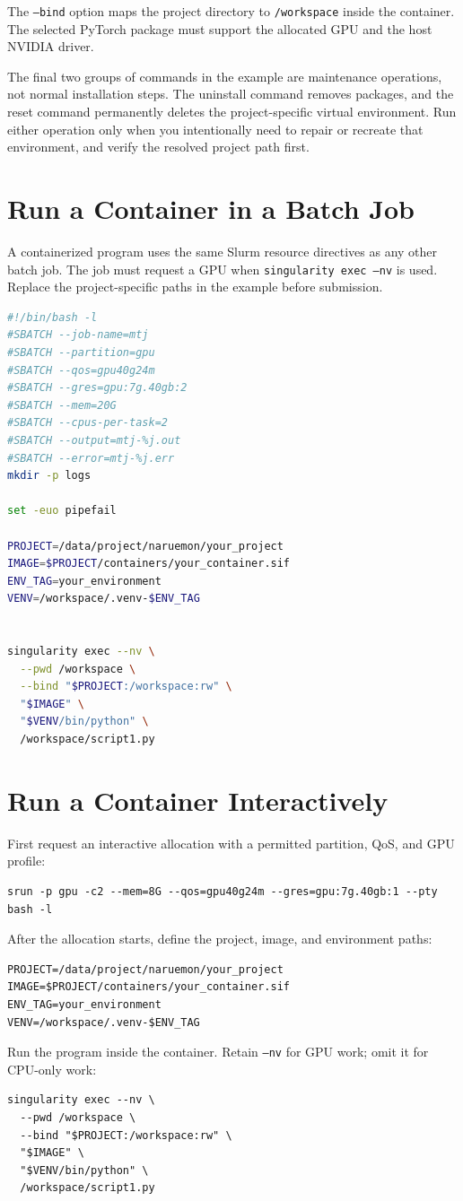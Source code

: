 \documentclass[11pt,oneside]{memoir}
\begin{document}
The \texttt{--bind} option maps the project directory to \texttt{/workspace} inside the container. The selected PyTorch package must support the allocated GPU and the host NVIDIA driver.

The final two groups of commands in the example are maintenance operations, not normal installation steps. The uninstall command removes packages, and the reset command permanently deletes the project-specific virtual environment. Run either operation only when you intentionally need to repair or recreate that environment, and verify the resolved project path first.

\section{Run a Container in a Batch Job}
\label{subsec:container-sbatch}

A containerized program uses the same Slurm resource directives as any other batch job. The job must request a GPU when \texttt{singularity exec --nv} is used. Replace the project-specific paths in the example before submission.
\begin{lstlisting}[language=bash]
#!/bin/bash -l
#SBATCH --job-name=mtj
#SBATCH --partition=gpu
#SBATCH --qos=gpu40g24m
#SBATCH --gres=gpu:7g.40gb:2
#SBATCH --mem=20G
#SBATCH --cpus-per-task=2
#SBATCH --output=mtj-%j.out
#SBATCH --error=mtj-%j.err
mkdir -p logs

set -euo pipefail

PROJECT=/data/project/naruemon/your_project
IMAGE=$PROJECT/containers/your_container.sif
ENV_TAG=your_environment
VENV=/workspace/.venv-$ENV_TAG


singularity exec --nv \
  --pwd /workspace \
  --bind "$PROJECT:/workspace:rw" \
  "$IMAGE" \
  "$VENV/bin/python" \
  /workspace/script1.py


\end{lstlisting}


\section{Run a Container Interactively}
\label{subsec:container-srun}

First request an interactive allocation with a permitted partition, QoS, and GPU profile:
\begin{lstlisting}[style = terminal]
  srun -p gpu -c2 --mem=8G --qos=gpu40g24m --gres=gpu:7g.40gb:1 --pty bash -l
\end{lstlisting}
After the allocation starts, define the project, image, and environment paths:
\begin{lstlisting}[style = terminal]
PROJECT=/data/project/naruemon/your_project
IMAGE=$PROJECT/containers/your_container.sif
ENV_TAG=your_environment
VENV=/workspace/.venv-$ENV_TAG
\end{lstlisting}
Run the program inside the container. Retain \texttt{--nv} for GPU work; omit it for CPU-only work:
\begin{lstlisting}[style = terminal]
  singularity exec --nv \
  --pwd /workspace \
  --bind "$PROJECT:/workspace:rw" \
  "$IMAGE" \
  "$VENV/bin/python" \
  /workspace/script1.py
\end{lstlisting}
\end{document}
